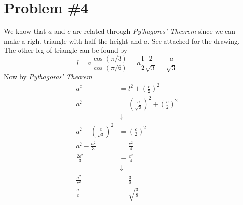 \documentclass[11pt]{article}
\numberwithin{equation}{section}
\begin{document}
\section{Problem \#4}
We know that $a$ and $c$ are related through \emph{Pythagoras' Theorem} since we can make a right triangle with half the height and $a$. See attached for the drawing. The other leg of triangle can be found by
$$l = a\frac{\cos(\pi/3)}{\cos(\pi/6)} = a\frac{1}{2}\frac{2}{\sqrt{3}} = \frac{a}{\sqrt{3}}$$
Now by \emph{Pythagoras' Theorem}
\begin{align*}
a^2 &= l^2+\left(\frac{c}{2}\right)^2\\
a^2 &= \left(\frac{a}{\sqrt{3}}\right)^2 +\left(\frac{c}{2}\right)^2\\
&\Downarrow\\
a^2 - \left(\frac{a}{\sqrt{3}}\right)^2  &= \left(\frac{c}{2}\right)^2\\
a^2 - \frac{a^2}{3}  &= \frac{c^2}{4}\\
\frac{2a^2}{3}  &= \frac{c^2}{4}\\
&\Downarrow\\
\frac{a^2}{c^2} &= \frac{3}{8}\\
\frac{a}{c}  &= \sqrt{\frac{3}{8}}
\end{align*}
\end{document}
